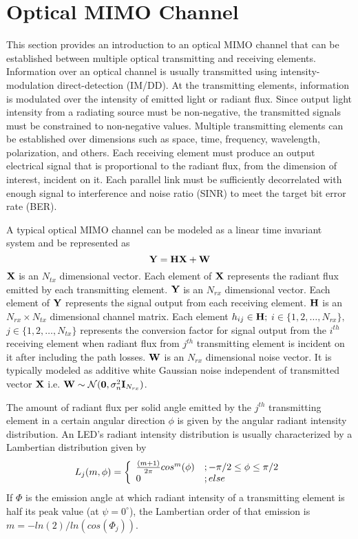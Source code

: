 \section{Optical MIMO Channel}\label{sec:mimo}
This section provides an introduction to an optical MIMO channel that can be established between multiple optical transmitting and receiving elements. Information over an optical channel is usually transmitted using intensity-modulation direct-detection (IM/DD). At the transmitting elements, information is modulated over the intensity of emitted light or radiant flux. Since output light intensity from a radiating source must be non-negative, the transmitted signals must be constrained to non-negative values. Multiple transmitting elements can be established over dimensions such as space, time, frequency, wavelength, polarization, and others. Each receiving element must produce an output electrical signal that is proportional to the radiant flux, from the dimension of interest, incident on it. Each parallel link must be sufficiently decorrelated with enough signal to interference and noise ratio (SINR) to meet the target bit error rate (BER). 

A typical optical MIMO channel can be modeled as a linear time invariant system and be represented as
\begin{equation}
	\label{eqMIMOch}
	\vm{Y} = \vm{H}\vm{X} + \vm{W}
\end{equation}
${\bf{X}}$ is an $N_{tx}$ dimensional vector. Each element of ${\bf{X}}$ represents the radiant flux emitted by each transmitting element. ${\bf{Y}}$ is an $N_{rx}$ dimensional vector. Each element of ${\bf{Y}}$ represents the signal output from each receiving element. ${\bf{H}}$ is an $N_{rx}\times N_{tx}$ dimensional channel matrix. Each element $h_{ij}\in {\bf{H}};$ $i\in \{1,2,\dots, N_{rx}\},$ $j\in \{1,2,\dots, N_{tx}\}$ represents the conversion factor for signal output from the $i^{th}$ receiving element when radiant flux from $j^{th}$ transmitting element is incident on it after including the path losses. ${\bf{W}}$ is an $N_{rx}$ dimensional noise vector. It is typically modeled as additive white Gaussian noise independent of transmitted vector ${\bf{X}}$ i.e. ${\bf{W}}\sim\mathcal{N}({\bf{0}},\sigma_n^2{\bf{I}}_{N_{rx}})$.

The amount of radiant flux per solid angle emitted by the $j^{th}$ transmitting element in a certain angular direction $\phi$ is given by the angular radiant intensity distribution. An LED's radiant intensity distribution is usually characterized by a Lambertian distribution given by
\begin{equation}
	\label{eqLamb}
	L_j(m,\phi) = \twopartdef{{\frac{(m+1)}{2\pi}}cos^{m}(\phi)}{-\pi/2\leq\phi\leq\pi/2}{0}{\mbox{ else}}
\end{equation}
If $\Phi$ is the emission angle at which radiant intensity of a transmitting element is half its peak value (at $\psi=0^\circ$), the Lambertian order of that emission is $m=-ln(2)/ln(cos(\Phi_{j}))$.

